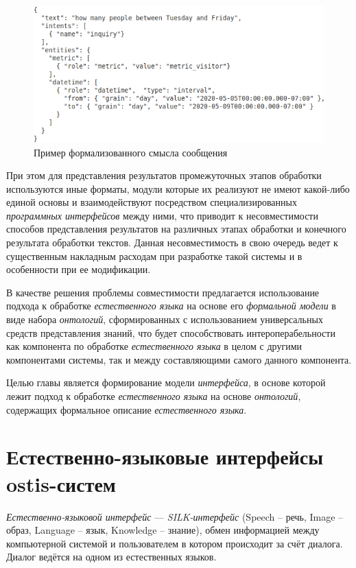 {\begin{figure}[h]
    \centerline{\includegraphics[scale=0.55]{images/part4/chapter_nl_interfaces/message_intents}}
    \caption{Пример формализованного смысла сообщения}
    \label{fig:message_intents}
\end{figure}

При этом для представления результатов промежуточных этапов обработки используются иные форматы, модули которые их реализуют не имеют какой-либо единой основы и взаимодействуют посредством специализированных \textit{программных интерфейсов} между ними, что приводит к несовместимости способов представления результатов на различных этапах обработки и конечного результата обработки текстов.
Данная несовместимость в свою очередь ведет к существенным накладным расходам при разработке такой системы и в особенности при ее модификации.

В качестве решения проблемы совместимости предлагается использование подхода к обработке \textit{естественного языка} на основе его \textit{формальной модели} в виде набора \textit{онтологий}, сформированных с использованием универсальных средств представления знаний, что будет способствовать интероперабельности как компонента по обработке \textit{естественного языка} в целом с другими компонентами системы, так и между составляющими самого данного компонента.

Целью главы является формирование модели \textit{интерфейса}, в основе которой лежит подход к обработке \textit{естественного языка} на основе \textit{онтологий}, содержащих формальное описание \textit{естественного языка}.

\section{Естественно-языковые интерфейсы ostis-систем}
\label{section_natural_language_interface}

\textit{Естественно-языковой интерфейс} --- \textit{SILK-интерфейс} (Speech – речь, Image – образ, Language – язык, Knowledge – знание), обмен информацией между компьютерной системой и пользователем в котором происходит за счёт диалога.
Диалог ведётся на одном из естественных языков.

}
